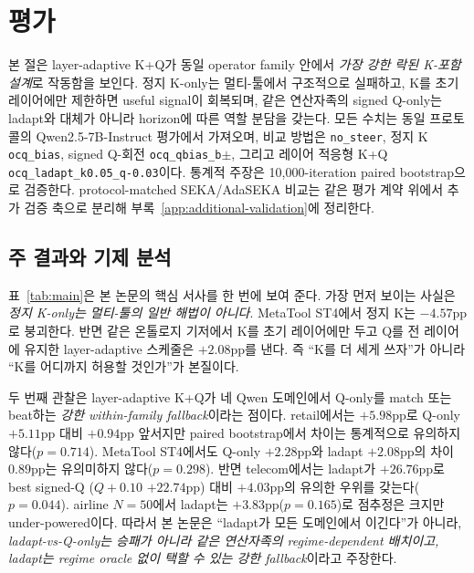 \section{평가}\label{sec:experiments}

본 절은 layer-adaptive K+Q가 동일 operator family 안에서 \emph{가장 강한 락된 K-포함 설계}로 작동함을 보인다. 정지 K-only는 멀티-툴에서 구조적으로 실패하고, K를 초기 레이어에만 제한하면 useful signal이 회복되며, 같은 연산자족의 signed Q-only는 ladapt와 대체가 아니라 horizon에 따른 역할 분담을 갖는다. 모든 수치는 동일 프로토콜의 Qwen2.5-7B-Instruct 평가에서 가져오며, 비교 방법은 \texttt{no\_steer}, 정지 K \texttt{ocq\_bias}, signed Q-회전 \texttt{ocq\_qbias\_b$\pm$}, 그리고 레이어 적응형 K+Q \texttt{ocq\_ladapt\_k0.05\_q-0.03}이다. 통계적 주장은 10{,}000-iteration paired bootstrap으로 검증한다. protocol-matched SEKA/AdaSEKA 비교는 같은 평가 계약 위에서 추가 검증 축으로 분리해 부록~\ref{app:additional-validation}에 정리한다.

\subsection{주 결과와 기제 분석}\label{sec:exp:main}

표~\ref{tab:main}은 본 논문의 핵심 서사를 한 번에 보여 준다. 가장 먼저 보이는 사실은 \emph{정지 K-only는 멀티-툴의 일반 해법이 아니다}. MetaTool ST4에서 정지 K는 $-4.57$pp로 붕괴한다. 반면 같은 온톨로지 기저에서 K를 초기 레이어에만 두고 Q를 전 레이어에 유지한 layer-adaptive 스케줄은 $+2.08$pp를 낸다. 즉 ``K를 더 세게 쓰자''가 아니라 ``K를 어디까지 허용할 것인가''가 본질이다.

두 번째 관찰은 layer-adaptive K+Q가 네 Qwen 도메인에서 Q-only를 match 또는 beat하는 \emph{강한 within-family fallback}이라는 점이다. retail에서는 $+5.98$pp로 Q-only $+5.11$pp 대비 $+0.94$pp 앞서지만 paired bootstrap에서 차이는 통계적으로 유의하지 않다($p=0.714$). MetaTool ST4에서도 Q-only $+2.28$pp와 ladapt $+2.08$pp의 차이 $0.89$pp는 유의미하지 않다($p=0.298$). 반면 telecom에서는 ladapt가 $+26.76$pp로 best signed-Q ($Q{+}0.10$ $+22.74$pp) 대비 $+4.03$pp의 유의한 우위를 갖는다($p=0.044$). airline $N{=}50$에서 ladapt는 $+3.83$pp($p=0.165$)로 점추정은 크지만 under-powered이다. 따라서 본 논문은 ``ladapt가 모든 도메인에서 이긴다''가 아니라, \emph{ladapt-vs-Q-only는 승패가 아니라 같은 연산자족의 regime-dependent 배치이고, ladapt는 regime oracle 없이 택할 수 있는 강한 fallback}이라고 주장한다.

